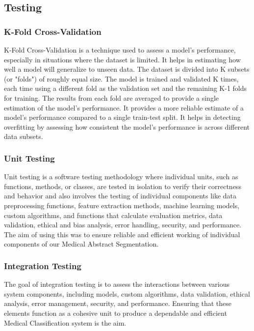 \documentclass[12pt,a4paper]{report}     %
\begin{document}
\begin{normalsize}
{{%


\section{Testing}
\subsubsection{K-Fold Cross-Validation}
K-Fold Cross-Validation is a technique used to assess a model's performance, especially in situations where the dataset is limited. It helps in estimating how well a model will generalize to unseen data. The dataset is divided into K subsets (or "folds") of roughly equal size. The model is trained and validated K times, each time using a different fold as the validation set and the remaining K-1 folds for training. The results from each fold are averaged to provide a single estimation of the model's performance. It provides a more reliable estimate of a model's performance compared to a single train-test split. It helps in detecting overfitting by assessing how consistent the model's performance is across different data subsets. 
\subsubsection{Unit Testing}
Unit testing is a software testing methodology where individual units, such as functions, methods, or classes, are tested in isolation to verify their correctness and behavior and also involves the testing of individual components like data preprocessing functions, feature extraction methods, machine learning models, custom algorithms, and functions that calculate evaluation metrics, data validation, ethical and bias analysis, error handling, security, and performance. The aim of using this was to ensure reliable and efficient working of individual components of our Medical Abstract Segmentation.
\subsubsection{Integration Testing}
The goal of integration testing is to assess the interactions between various system components, including models, custom algorithms, data validation, ethical analysis, error management, security, and performance. Ensuring that these elements function as a cohesive unit to produce a dependable and efficient Medical Classification system is the aim.
}}
\end{normalsize}
\end{document}
